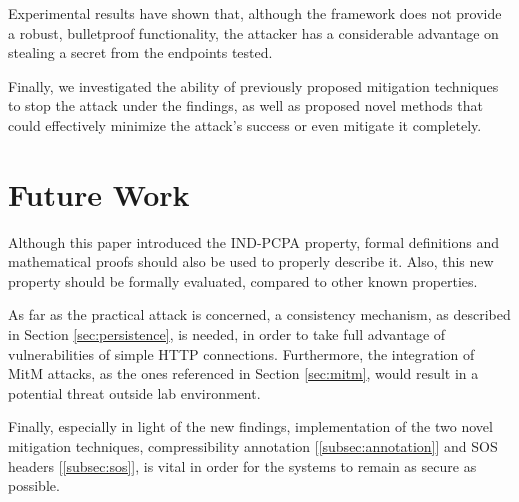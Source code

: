 Experimental results have shown that, although the framework does not provide a
robust, bulletproof functionality, the attacker has a considerable advantage on
stealing a secret from the endpoints tested.

Finally, we investigated the ability of previously proposed mitigation
techniques to stop the attack under the findings, as well as proposed novel
methods that could effectively minimize the attack's success or even mitigate it
completely.

\section{Future Work}

Although this paper introduced the IND-PCPA property, formal definitions and
mathematical proofs should also be used to properly describe it. Also, this new
property should be formally evaluated, compared to other known properties.

As far as the practical attack is concerned, a consistency mechanism, as
described in Section \ref{sec:persistence}, is needed, in order to take full
advantage of vulnerabilities of simple HTTP connections. Furthermore, the
integration of MitM attacks, as the ones referenced in Section \ref{sec:mitm},
would result in a potential threat outside lab environment.

Finally, especially in light of the new findings, implementation of the two
novel mitigation techniques, compressibility annotation
[\ref{subsec:annotation}] and SOS headers [\ref{subsec:sos}], is vital in order
for the systems to remain as secure as possible.
